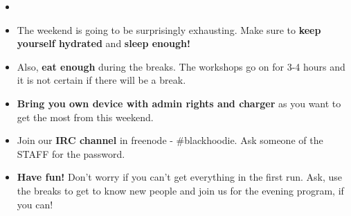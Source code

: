 \def\pagetitletext{Before The Bootcamp...}
{\large
\begin{changemargin}{1em}{3em}
\begin{itemize}
~\vspace{\fill}\\
\item{}
\item{The weekend is going to be surprisingly exhausting. Make sure to \textbf{keep yourself hydrated} and \textbf{sleep enough!}}
\vspace*{\fill}\\
\item{Also, \textbf{eat enough} during the breaks. The workshops go on for 3-4 hours and it is not certain if there will be a break.}
\vspace*{\fill}\\
\item{\textbf{Bring you own device with admin rights and charger} as you want to get the most from this weekend.}
\vspace*{\fill}\\
\item{Join our \textbf{IRC channel} in freenode - \#blackhoodie. Ask someone of the STAFF for the password.}
\vspace*{\fill}\\
\item{\textbf{Have fun!} Don’t worry if you can't get everything in the first run. Ask, use the breaks to get to know new people and join us for the evening program, if you can!}
\vspace*{\fill}\\
\end{itemize}
\end{changemargin}
}
